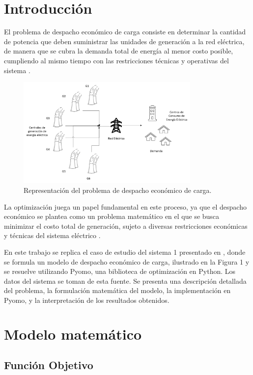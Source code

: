 \documentclass[11pt]{article}
\begin{document}
\section{Introducción}	
El problema de despacho económico de carga consiste en determinar la cantidad de potencia que deben suministrar las unidades de generación a la red eléctrica, de manera que se cubra la demanda total de energía al menor costo posible, cumpliendo al mismo tiempo con las restricciones técnicas y operativas del sistema \citep{en17030550}.

\begin{figure}[h!]
    \centering
    \includegraphics[width=0.8\textwidth]{economic-dispatch.png}
    \caption{Representación del problema de despacho económico de carga.}
    \label{fig:economic_dispatch}
\end{figure}

La optimización juega un papel fundamental en este proceso, ya que el despacho económico se plantea como un problema matemático en el que se busca minimizar el costo total de generación, sujeto a diversas restricciones económicas y técnicas del sistema eléctrico \citep{osti_6202356}.

En este trabajo se replica el caso de estudio del sistema 1 presentado en \citep{electronics9010108}, donde se formula un modelo de despacho económico de carga, ilustrado en la Figura 1 y se resuelve utilizando Pyomo, una biblioteca de optimización en Python. Los datos del sistema se toman de esta fuente. Se presenta una descripción detallada del problema, la formulación matemática del modelo, la implementación en Pyomo, y la interpretación de los resultados obtenidos.
\newpage
\section{Modelo matemático}
\subsection{Función Objetivo}
\end{document}
